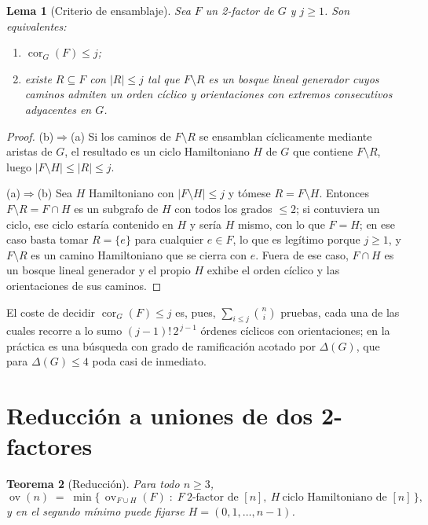 \documentclass[11pt,a4paper]{article}
\newtheorem{teorema}{Teorema}[section]
\newtheorem{lema}[teorema]{Lema}
\theoremstyle{definition}
\theoremstyle{remark}
\newcommand{\ov}{\operatorname{ov}}
\newcommand{\cor}{\operatorname{cor}}
\begin{document}
\begin{lema}[Criterio de ensamblaje]\label{lem:ensamblaje}
Sea $F$ un 2-factor de $G$ y $j\ge1$. Son equivalentes:
\begin{enumerate}[label=(\alph*)]
\item $\cor_G(F)\le j$;
\item existe $R\subseteq F$ con $|R|\le j$ tal que $F\setminus R$ es un bosque lineal generador cuyos caminos admiten un orden cíclico y orientaciones con extremos consecutivos adyacentes en $G$.
\end{enumerate}
\end{lema}

\begin{proof}
(b)$\Rightarrow$(a) Si los caminos de $F\setminus R$ se ensamblan cíclicamente mediante aristas de $G$, el resultado es un ciclo Hamiltoniano $H$ de $G$ que contiene $F\setminus R$, luego $|F\setminus H|\le|R|\le j$.

(a)$\Rightarrow$(b) Sea $H$ Hamiltoniano con $|F\setminus H|\le j$ y tómese $R=F\setminus H$. Entonces $F\setminus R=F\cap H$ es un subgrafo de $H$ con todos los grados $\le2$; si contuviera un ciclo, ese ciclo estaría contenido en $H$ y sería $H$ mismo, con lo que $F=H$; en ese caso basta tomar $R=\{e\}$ para cualquier $e\in F$, lo que es legítimo porque $j\ge1$, y $F\setminus R$ es un camino Hamiltoniano que se cierra con $e$. Fuera de ese caso, $F\cap H$ es un bosque lineal generador y el propio $H$ exhibe el orden cíclico y las orientaciones de sus caminos.
\end{proof}

El coste de decidir $\cor_G(F)\le j$ es, pues, $\sum_{i\le j}\binom{n}{i}$ pruebas, cada una de las cuales recorre a lo sumo $(j-1)!\,2^{\,j-1}$ órdenes cíclicos con orientaciones; en la práctica es una búsqueda con grado de ramificación acotado por $\Delta(G)$, que para $\Delta(G)\le4$ poda casi de inmediato.

\section{Reducción a uniones de dos 2-factores}\label{sec:reduccion}

\begin{teorema}[Reducción]\label{thm:reduccion}
Para todo $n\ge3$,
\[
\ov(n)\;=\;\min\bigl\{\,\ov_{F\cup H}(F)\;:\;F\ \text{2-factor de }[n],\ H\ \text{ciclo Hamiltoniano de }[n]\,\bigr\},
\]
y en el segundo mínimo puede fijarse $H=(0,1,\dots,n-1)$.
\end{teorema}
\end{document}
